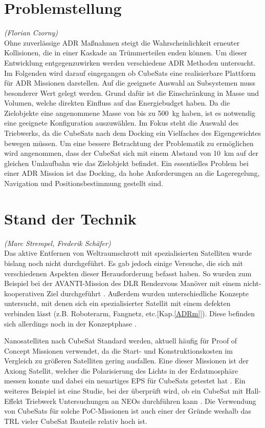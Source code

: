 		\section{Problemstellung}
		\hfill\emph{(Florian Czorny)}\\
Ohne zuverlässige ADR Maßnahmen steigt die Wahrscheinlichkeit erneuter Kollisionen, die in einer Kaskade an Trümmerteilen enden können. Um dieser Entwicklung entgegenzuwirken werden verschiedene ADR Methoden untersucht.
Im Folgenden wird darauf eingegangen ob CubeSats eine realisierbare Plattform für ADR Missionen darstellen.
Auf die geeignete Auswahl an Subsystemen muss besonderer Wert gelegt werden. Grund dafür ist die Einschränkung in Masse und Volumen, welche direkten Einfluss auf das Energiebudget haben. Da die Zielobjekte eine angenommene Masse von bis zu \SI{500}{\kilogram} haben, ist es notwendig eine geeignete Konfiguration auszuwählen. Im Fokus steht die Auswahl des Triebwerks, da die CubeSats nach dem Docking ein Vielfaches des Eigengewichtes bewegen müssen. Um eine bessere Betrachtung der Problematik zu ermöglichen wird angenommen, dass der CubeSat sich mit einem Abstand von \SI{10}{\kilo\metre} auf der gleichen Umlaufbahn wie das Zielobjekt befindet. Ein essentielles Problem bei einer ADR Mission ist das Docking, da hohe Anforderungen an die Lageregelung, Navigation und Positionsbestimmung gestellt sind. 

		\section{Stand der Technik}
		\hfill\emph{(Marc Strempel, Frederik Schäfer)}\\	
Das aktive Entfernen von Weltraumschrott mit spezialisierten Satelliten wurde bislang noch nicht durchgeführt. Es gab jedoch einige Versuche, die sich mit verschiedenen Aspekten dieser Herausforderung befasst haben. So wurden zum Beispiel bei der AVANTI-Mission des DLR Rendezvous Manöver mit einem nicht-kooperativen Ziel durchgeführt \cite{Gaias.2018,Gaias.2018b}. 
Außerdem wurden unterschiedliche Konzepte untersucht, mit denen sich ein spezialisierter Satellit mit einem defekten verbinden lässt (z.B. Roboterarm, Fangnetz, etc.[Kap.\ref{ADRm}]). Diese befinden sich allerdings noch in der Konzeptphase \cite{Mark.2019}.

Nanosatelliten nach CubeSat Standard werden, aktuell häufig für Proof of Concept Missionen verwendet, da die Start- und Konstruktionskosten im Vergleich zu größeren Satelliten gering ausfallen. Eine dieser Missionen ist der Axiong Satellit, welcher die Polarisierung des Lichts in der Erdatmosphäre messen konnte und dabei ein neuartiges EPS für CubeSats getestet hat \cite{Peng.2018}. Ein weiteres Beispiel ist eine Studie, bei der überprüft wird, ob ein CubeSat mit Hall-Effekt Triebwerk Untersuchungen an NEOs durchführen kann \cite{UniversityofStrathclydeGlasgow.2018}. Die Verwendung von CubeSats für solche PoC-Missionen ist auch einer der Gründe weshalb das TRL vieler CubeSat Bauteile relativ hoch ist.



